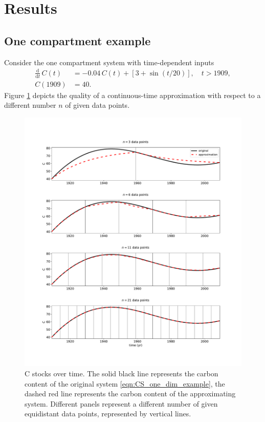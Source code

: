 \documentclass[11pt,a4paper]{article}
\newcommand{\deriv}[1]{\frac{\mathrm{d}}{\mathrm{d}#1}}
\begin{document}
\section{Results}
\subsection{One compartment example}
Consider the one compartment system with time-dependent inputs
\begin{equation}\label{eqn:CS_one_dim_example}
    \begin{aligned}
        \deriv{t}\,C(t) &= -0.04\,C(t) + \left[3+\sin(t/20)\right],\quad t>1909,\\
        C(1909) &= 40.
    \end{aligned}
\end{equation}
Figure \ref{fig:CS_one_dim_example} depicts the quality of a continuous-time approximation with respect to a different number $n$ of given data points.
\begin{figure}[htbp]
    \centering 
    \includegraphics[width=1.0\linewidth]{figs/interpol_pwc_1.pdf}
    \caption{C stocks over time.
        The solid black line represents the carbon content of the original system \eqref{eqn:CS_one_dim_example}, the dashed red line represents the carbon content of the approximating system.
        Different panels represent a different number of given equidistant data points, represented by vertical lines.
        }
    \label{fig:CS_one_dim_example}
\end{figure}        
\end{document}
